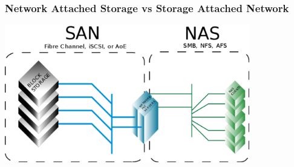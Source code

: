 \begin{frame}
    \frametitle{Network Attached Storage vs Storage Attached Network}
    \includegraphics[height=6cm]{../../slides/nfs/images/sannas.png}

\end{frame}